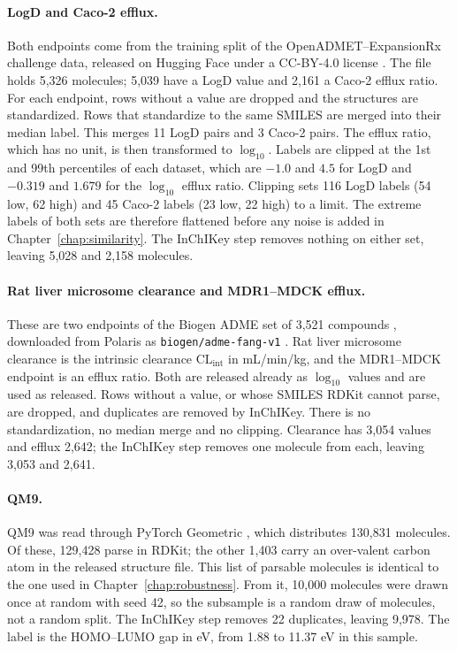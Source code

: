\paragraph{LogD and Caco-2 efflux.} Both endpoints come from the training split of the OpenADMET--ExpansionRx challenge data, released on Hugging Face under a CC-BY-4.0 license \citep{openadmet}. The file holds 5,326 molecules; 5,039 have a LogD value and 2,161 a Caco-2 efflux ratio. For each endpoint, rows without a value are dropped and the structures are standardized. Rows that standardize to the same SMILES are merged into their median label. This merges 11 LogD pairs and 3 Caco-2 pairs. The efflux ratio, which has no unit, is then transformed to $\log_{10}$. Labels are clipped at the 1st and 99th percentiles of each dataset, which are $-1.0$ and $4.5$ for LogD and $-0.319$ and $1.679$ for the $\log_{10}$ efflux ratio. Clipping sets 116 LogD labels (54 low, 62 high) and 45 Caco-2 labels (23 low, 22 high) to a limit. The extreme labels of both sets are therefore flattened before any noise is added in Chapter~\ref{chap:similarity}. The InChIKey step removes nothing on either set, leaving 5,028 and 2,158 molecules.

\paragraph{Rat liver microsome clearance and MDR1--MDCK efflux.} These are two endpoints of the Biogen ADME set of 3,521 compounds \citep{fang2023}, downloaded from Polaris as \texttt{biogen/adme-fang-v1} \citep{polaris}. Rat liver microsome clearance is the intrinsic clearance $\mathrm{CL_{int}}$ in mL/min/kg, and the MDR1--MDCK endpoint is an efflux ratio. Both are released already as $\log_{10}$ values and are used as released. Rows without a value, or whose SMILES RDKit cannot parse, are dropped, and duplicates are removed by InChIKey. There is no standardization, no median merge and no clipping. Clearance has 3,054 values and efflux 2,642; the InChIKey step removes one molecule from each, leaving 3,053 and 2,641.

\paragraph{QM9.} QM9 \citep{Ramakrishnan2014, qm9_dataset} was read through PyTorch Geometric \citep{pytorchGeometric}, which distributes 130,831 molecules. Of these, 129,428 parse in RDKit; the other 1,403 carry an over-valent carbon atom in the released structure file. This list of parsable molecules is identical to the one used in Chapter~\ref{chap:robustness}. From it, 10,000 molecules were drawn once at random with seed 42, so the subsample is a random draw of molecules, not a random split. The InChIKey step removes 22 duplicates, leaving 9,978. The label is the HOMO--LUMO gap in eV, from 1.88 to 11.37 eV in this sample.

